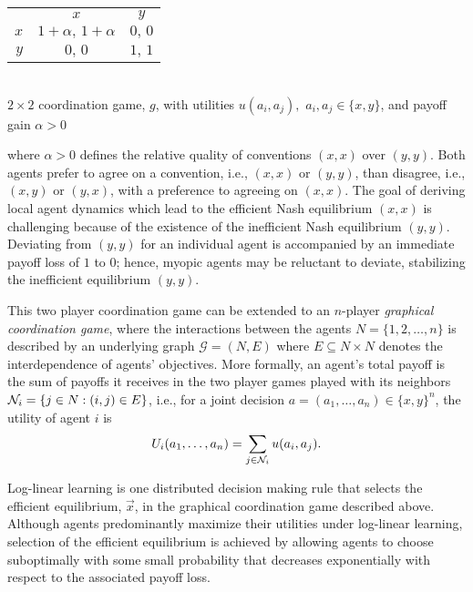 \begin{center}
\begin{tabular}{r|c|c|}
\multicolumn{1}{r}{}	&\multicolumn{1}{c}{$x$}	&\multicolumn{1}{c}{$y$}\\
\cline{2-3}$x$			&$1+\alpha,\,1+\alpha$	&$0,\,0$\\
\cline{2-3}$y$			&$0,\,0$				&$1,\,1$\\
\cline{2-3}
\end{tabular}\\
\medskip
$2\times 2$ coordination game, $g$, with utilities $u(a_i,a_j),$ $a_i,a_j\in\{x,y\}$, and payoff gain $\alpha>0$
\end{center}
where $\alpha > 0$ defines the relative quality of conventions $(x,x)$ over $(y,y)$.  Both agents prefer to agree on a convention, i.e., $(x,x)$ or $(y,y)$, than disagree, i.e., $(x,y)$ or $(y,x)$, with a preference to agreeing on $(x,x)$.  
The goal of deriving local agent dynamics which lead to the efficient Nash equilibrium $(x,x)$ is challenging because of the existence of the inefficient Nash equilibrium $(y,y)$.  Deviating from $(y,y)$ for an individual agent is accompanied by an immediate payoff loss of $1$ to $0$; hence, myopic agents may be reluctant to deviate, stabilizing the inefficient equilibrium $(y,y)$.

This two player coordination game can be extended to an $n$-player {\it graphical coordination game}\cite{Kearns2001,Young2011, Montanari2010}, where the interactions between the agents $N=\{1, 2, \dots, n\}$ is described by an underlying graph $\mathcal{G} = (N,E)$ where $E \subseteq N\times N$ denotes the interdependence of agents' objectives.  More formally, an agent's total payoff is the sum of payoffs it receives in the two player games played with its neighbors ${\cal N}_i = \{j \in N : (i,j) \in E\}$, i.e., for a joint decision $a = (a_1, \dots, a_n) \in \{x,y\}^n$, the utility of agent $i$ is
%
\begin{equation}\label{e:original utility}
%
U_i(a_1, \dots, a_n) = \sum_{j \in {\cal N}_i} u(a_i, a_j).
%
\end{equation}

Log-linear learning \cite{Blume1993, Shah2010} is one distributed decision making rule that selects the efficient equilibrium, $\vec{x}$, in the graphical coordination game described above. Although agents predominantly maximize their utilities under log-linear learning, selection of the efficient equilibrium is achieved by allowing agents to choose suboptimally with some small probability that decreases exponentially with respect to the associated payoff loss. 

